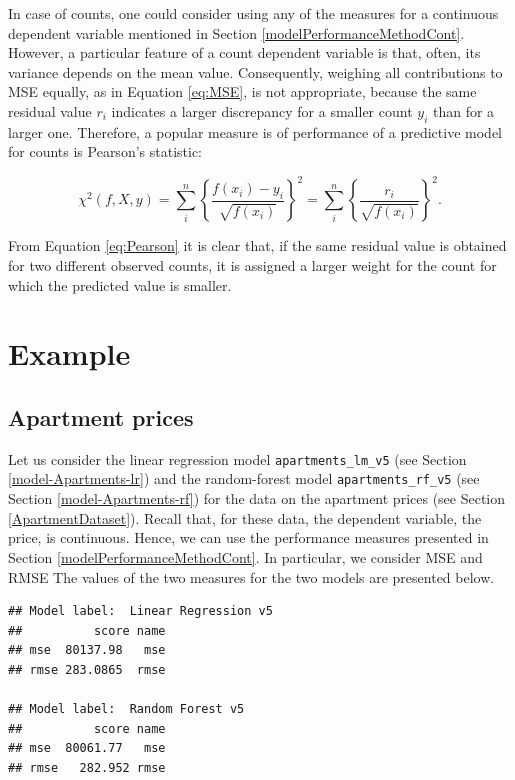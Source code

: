\documentclass[]{krantz}
\begin{document}
In case of counts, one could consider using any of the measures for a continuous dependent variable mentioned in Section \ref{modelPerformanceMethodCont}. However, a particular feature of a count dependent variable is that, often, its variance depends on the mean value. Consequently, weighing all contributions to MSE equally, as in Equation \eqref{eq:MSE}, is not appropriate, because the same residual value \(r_i\) indicates a larger discrepancy for a smaller count \(y_i\) than for a larger one. Therefore, a popular measure is of performance of a predictive model for counts is Pearson's statistic:

\begin{equation}
\chi^2(f,X,y) = \sum_{i}^{n} \left\{\frac{f(x_i) - y_i}{\sqrt{f(x_i)}}\right\}^2 = \sum_{i}^{n} \left\{\frac{r_i}{\sqrt{f(x_i)}}\right\}^2.
\label{eq:Pearson}
\end{equation}

From Equation \eqref{eq:Pearson} it is clear that, if the same residual value is obtained for two different observed counts, it is assigned a larger weight for the count for which the predicted value is smaller.

\hypertarget{example}{%
\section{Example}\label{example}}

\hypertarget{modelPerformanceApartments}{%
\subsection{Apartment prices}\label{modelPerformanceApartments}}

Let us consider the linear regression model \texttt{apartments\_lm\_v5} (see Section \ref{model-Apartments-lr}) and the random-forest model \texttt{apartments\_rf\_v5} (see Section \ref{model-Apartments-rf}) for the data on the apartment prices (see Section \ref{ApartmentDataset}). Recall that, for these data, the dependent variable, the price, is continuous. Hence, we can use the performance measures presented in Section \ref{modelPerformanceMethodCont}. In particular, we consider MSE and RMSE The values of the two measures for the two models are presented below.

\begin{verbatim}
## Model label:  Linear Regression v5 
##          score name
## mse  80137.98   mse
## rmse 283.0865  rmse

## Model label:  Random Forest v5 
##          score name
## mse  80061.77   mse
## rmse   282.952 rmse
\end{verbatim}
\end{document}
